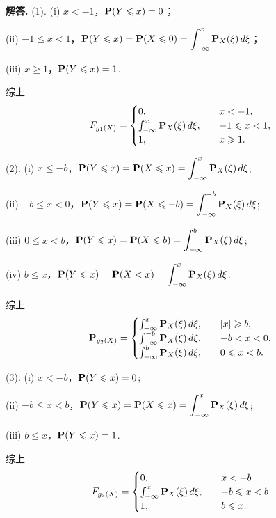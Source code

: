 \documentclass[12pt, a4paper, oneside]{ctexart}
\newenvironment{solution}{\par\noindent\textbf{解答. }}{\bigskip\par}
\begin{document}
\begin{solution}
    (1). (i) $x < -1$，$\P(Y\leqslant x) = 0$；

    (ii) $-1\leqslant x < 1$，$\disp\P(Y\leqslant x) = \P(X \leqslant 0) = \int_{-\infty}^x\P_X(\xi)\,d\xi$；

    (iii) $x\geqslant 1$，$\disp \P(Y\leqslant x) = 1$.

    综上
    \begin{equation*}
        F_{g_1(X)} = \begin{cases}
            0,&\quad x < -1,\\
            \int_{-\infty}^x\P_X(\xi)\,d\xi,&\quad -1\leqslant x < 1,\\
            1,&\quad x\geqslant 1.
        \end{cases}
    \end{equation*}

    (2). (i) $x\leqslant -b$，$\disp\P(Y\leqslant x) = \P(X\leqslant x)=\int_{-\infty}^x\P_X(\xi)\,d\xi$;

    (ii) $-b\leqslant x < 0$，$\disp\P(Y\leqslant x) = \P(X\leqslant -b) = \int_{-\infty}^{-b}\P_X(\xi)\,d\xi$;

    (iii) $0\leqslant x < b$，$\disp\P(Y\leqslant x)=\P(X\leqslant b)=\int_{-\infty}^b\P_X(\xi)\,d\xi$;

    (iv) $b\leqslant x$，$\disp\P(Y\leqslant x) = \P(X < x) = \int_{-\infty}^x\P_X(\xi)\,d\xi$.

    综上
    \begin{equation*}
        \P_{g_2(X)} = \begin{cases}
            \int_{-\infty}^x\P_X(\xi)\,d\xi,&\quad |x|\geqslant b,\\
            \int_{-\infty}^{-b}\P_X(\xi)\,d\xi,&\quad -b< x < 0,\\
            \int_{-\infty}^{b}\P_X(\xi)\,d\xi,&\quad 0\leqslant x < b.\\
        \end{cases}
    \end{equation*}

    (3). (i) $x < -b$，$\P(Y\leqslant x) = 0$;

    (ii) $-b\leqslant x  < b$，$\disp\P(Y\leqslant x) = \P(X\leqslant x) = \int_{-\infty}^x\P_X(\xi)\,d\xi$;

    (iii) $b\leqslant x$，$\disp \P(Y\leqslant x) = 1$.
    
    综上
    \begin{equation*}
        F_{g_3(X)} = \begin{cases}
            0,&\quad x< -b\\
            \int_{-\infty}^x\P_X(\xi)\,d\xi,&\quad -b\leqslant x < b\\
            1,&\quad b\leqslant x.
        \end{cases}
    \end{equation*}
\end{solution}
\end{document}
